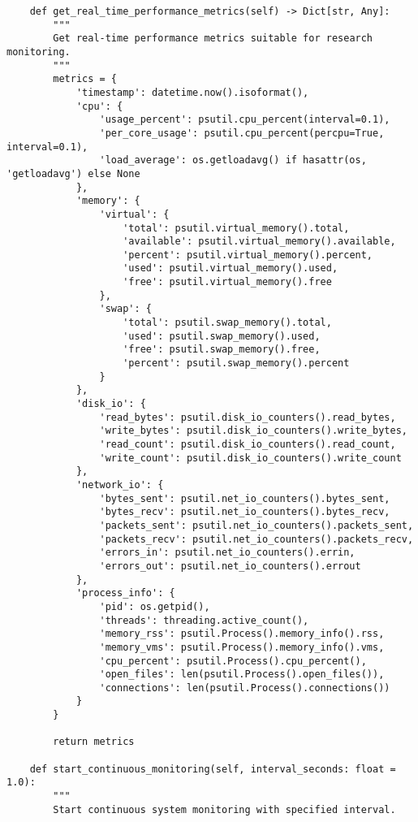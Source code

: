 \documentclass[12pt,a4paper]{article}
\begin{document}
\begin{verbatim}
    def get_real_time_performance_metrics(self) -> Dict[str, Any]:
        """
        Get real-time performance metrics suitable for research monitoring.
        """
        metrics = {
            'timestamp': datetime.now().isoformat(),
            'cpu': {
                'usage_percent': psutil.cpu_percent(interval=0.1),
                'per_core_usage': psutil.cpu_percent(percpu=True, interval=0.1),
                'load_average': os.getloadavg() if hasattr(os, 'getloadavg') else None
            },
            'memory': {
                'virtual': {
                    'total': psutil.virtual_memory().total,
                    'available': psutil.virtual_memory().available,
                    'percent': psutil.virtual_memory().percent,
                    'used': psutil.virtual_memory().used,
                    'free': psutil.virtual_memory().free
                },
                'swap': {
                    'total': psutil.swap_memory().total,
                    'used': psutil.swap_memory().used,
                    'free': psutil.swap_memory().free,
                    'percent': psutil.swap_memory().percent
                }
            },
            'disk_io': {
                'read_bytes': psutil.disk_io_counters().read_bytes,
                'write_bytes': psutil.disk_io_counters().write_bytes,
                'read_count': psutil.disk_io_counters().read_count,
                'write_count': psutil.disk_io_counters().write_count
            },
            'network_io': {
                'bytes_sent': psutil.net_io_counters().bytes_sent,
                'bytes_recv': psutil.net_io_counters().bytes_recv,
                'packets_sent': psutil.net_io_counters().packets_sent,
                'packets_recv': psutil.net_io_counters().packets_recv,
                'errors_in': psutil.net_io_counters().errin,
                'errors_out': psutil.net_io_counters().errout
            },
            'process_info': {
                'pid': os.getpid(),
                'threads': threading.active_count(),
                'memory_rss': psutil.Process().memory_info().rss,
                'memory_vms': psutil.Process().memory_info().vms,
                'cpu_percent': psutil.Process().cpu_percent(),
                'open_files': len(psutil.Process().open_files()),
                'connections': len(psutil.Process().connections())
            }
        }
        
        return metrics
    
    def start_continuous_monitoring(self, interval_seconds: float = 1.0):
        """
        Start continuous system monitoring with specified interval.
        

\end{verbatim}
\end{document}
